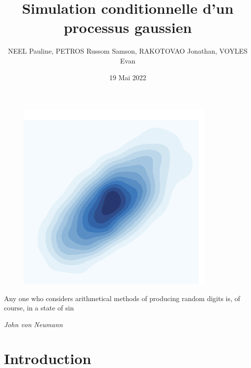 \documentclass[10pt]{article} %
\title{Simulation conditionnelle d’un processus gaussien}
\author{NEEL Pauline, PETROS Russom Samson, RAKOTOVAO Jonathan, VOYLES Evan}
\date{19 Mai 2022}
\begin{document}
\begin{titlepage}

\maketitle

\begin{figure}[h!]
    \centering
    \includegraphics{media/plot.png}
\end{figure}

\vspace{3cm}





\epigraph{Any one who considers arithmetical methods of producing random digits is, of course, in a state of sin}
 {\textit{John von Neumann}}

\newpage

\end{titlepage}

\pagestyle{fancy}

\tableofcontents

\newpage

\section{Introduction}
\end{document}
